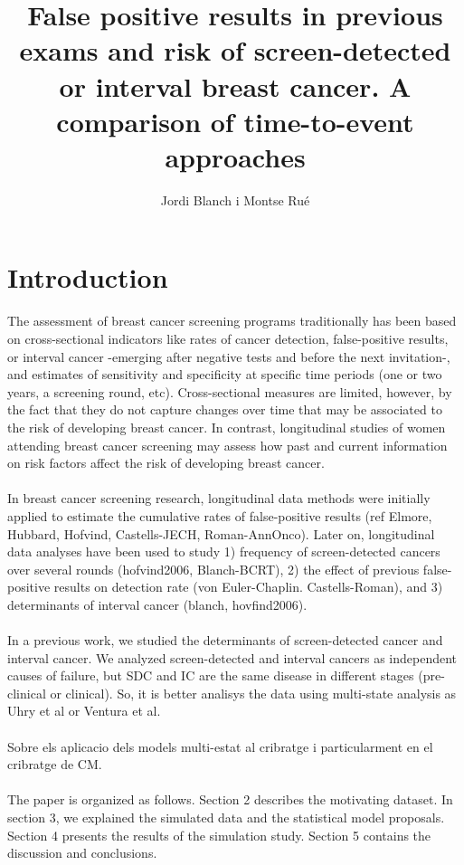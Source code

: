 \documentclass[10pt,a4paper]{article}
\author{Jordi Blanch i Montse Ru\'e}
\title{False positive results in previous exams and risk of screen-detected or interval breast cancer. A comparison of time-to-event approaches}
\begin{document}
\section{Introduction}
The assessment of breast cancer screening programs traditionally has been based on cross-sectional indicators like rates of cancer detection, false-positive results, or interval cancer -emerging after negative tests and before the next invitation-, and estimates of sensitivity and specificity at specific time periods (one or two years, a screening round, etc). Cross-sectional measures are limited, however, by the fact that they do not capture changes over time that may be associated to the risk of developing breast cancer. In contrast, longitudinal studies of women attending breast cancer screening may assess how past and current information on risk factors affect the risk of developing breast cancer.

\paragraph{}In breast cancer screening research, longitudinal data methods were initially applied to estimate the cumulative rates of false-positive results (ref Elmore, Hubbard, Hofvind, Castells-JECH, Roman-AnnOnco). Later on, longitudinal data analyses have been used to study 1) frequency of screen-detected cancers over several rounds (hofvind2006, Blanch-BCRT), 2) the effect of previous false-positive results on detection rate (von Euler-Chaplin. Castells-Roman), and 3) determinants of interval cancer  (blanch, hovfind2006). 

\paragraph{}In a previous work, we studied the determinants of screen-detected cancer and interval cancer. We analyzed screen-detected and interval cancers as independent causes of failure, but SDC and IC are the same disease in different stages (pre-clinical or clinical). So, it is better analisys the data using multi-state analysis as Uhry et al or Ventura et al.

\paragraph{}Sobre els aplicacio dels models multi-estat al cribratge i particularment en el cribratge de CM.

\paragraph{}The paper is organized as follows. Section 2 describes the motivating dataset. In section 3, we explained the simulated data and the statistical model proposals. Section 4 presents the results of the simulation study. Section 5 contains the discussion and conclusions.
\end{document}
